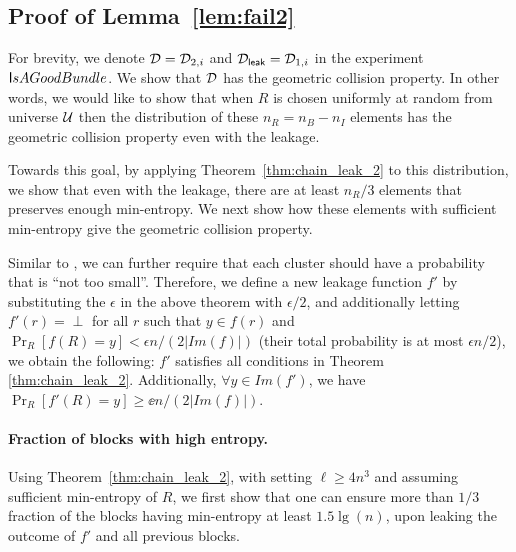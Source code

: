 \subsection{Proof of Lemma~\ref{lem:fail2}}
\label{sec:tradeoff}
For brevity, we denote $\DDD = \DDD_{2,i}$ and $\DDD_\leak = \DDD_{1,i}$ in the
experiment $\sf IsAGoodBundle$. We show that $\DDD$ has the geometric collision
property. 
%
In other words, we would like to show that when $R$ is chosen uniformly at random from universe $\U$  then the distribution of these $n_R = n_B - n_I$ elements has the geometric collision property even with the leakage. 

Towards this goal, by applying Theorem~\ref{thm:chain_leak_2} to this distribution, we show that even with the leakage, there are at least $n_R/3$ elements that preserves enough min-entropy. We next show how these elements with sufficient min-entropy give the geometric collision property. 

\begin{remark}\label{rem:del_tiny_2}
Similar to \cite[Remark 2]{skorski2019strong}, we can further require that each cluster should have a probability that is ``not too small''. Therefore, we define a new leakage function $f'$ by substituting the $\epsilon$ in the above theorem with $\epsilon/2$, 
and additionally letting $f'(r) = \perp$ for all $r$ such that $y \in f(r)$ and $\Pr_R[f(R) =y] < \epsilon n/(2|Im(f)|)$ (their total probability is at most $\epsilon n/2$), we obtain the following: 
%
$f'$ satisfies all conditions in Theorem \ref{thm:chain_leak_2}. Additionally, $\forall y \in Im(f')$, we have $\Pr_R[f'(R) =y] \geq \ee n / (2 |Im(f)|)$.
\end{remark}



\paragraph{Fraction of blocks with high entropy.}
Using Theorem~\ref{thm:chain_leak_2}, with setting  $\ell \geq 4n^3$ and
assuming sufficient min-entropy of $R$, we first show that one can ensure more than
$1/3$ fraction of the blocks having min-entropy at least $1.5\lg(n)$, upon
leaking the outcome of $f'$ and all previous blocks. 

